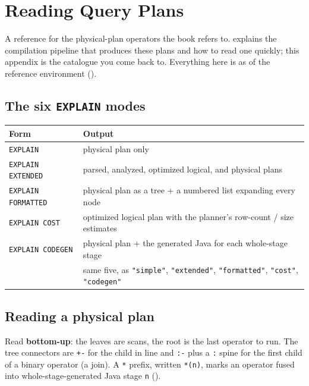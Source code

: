 \chapter{Reading Query Plans}
\label{app:plans}

A reference for the physical-plan operators the book refers to. 
explains the compilation pipeline that produces these plans and how to read one
quickly; this appendix is the catalogue you come back to. Everything here is as
of the reference environment ().

\section{The six \texttt{EXPLAIN} modes}

\begin{table}[H]
\centering\footnotesize
\renewcommand{\arraystretch}{1.15}
\begin{tabular}{@{}P{3cm}P{10.8cm}@{}}
\toprule
\textbf{Form} & \textbf{Output} \\
\midrule
\texttt{EXPLAIN} & physical plan only \\
\texttt{EXPLAIN EXTENDED} & parsed, analyzed, optimized logical, and physical plans \\
\texttt{EXPLAIN FORMATTED} & physical plan as a tree + a numbered list expanding every node \\
\texttt{EXPLAIN COST} & optimized logical plan with the planner's row-count / size estimates \\
\texttt{EXPLAIN CODEGEN} & physical plan + the generated Java for each whole-stage stage \\
 & same five, as \texttt{"simple"}, \texttt{"extended"}, \texttt{"formatted"}, \texttt{"cost"}, \texttt{"codegen"} \\
\bottomrule
\end{tabular}
\end{table}

\section{Reading a physical plan}

Read \textbf{bottom-up}: the leaves are scans, the root is the last operator to
run. The tree connectors are \texttt{+-} for the child in line and \texttt{:-}
plus a \texttt{:} spine for the first child of a binary operator (a join). A
\texttt{*} prefix, written \texttt{*(n)}, marks an operator fused into
whole-stage-generated Java stage \texttt{n} ().

